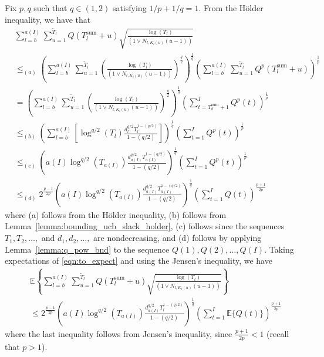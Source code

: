 \documentclass[12pt,draftcls, onecolumn]{IEEEtran}
\begin{document}
Fix $p,q$ such that $q \in (1,2)$ satisfying $1/p + 1/q = 1$. From the H{\"o}lder inequality, we have that
\begin{align}\label{eqn:to_expect}
    &\sum_{l=b}^{a( I)}\sum_{u=1}^{\tilde{T}_l} Q(T^{\text{sum}}_l+u)\sqrt{\frac{\log\left(T_l\right)}{(1 \vee N_{l,K_l(u)}(u-1))}} \nonumber\\&\leq_{(a)} \left(\sum_{l=b}^{a( I)}\sum_{u=1}^{\tilde{T}_l} \left(\frac{\log\left(T_l\right)}{(1 \vee N_{l,K_l(u)}(u-1))}\right)^{\frac{q}{2}}\right)^{\frac{1}{q}}\left(\sum_{l=b}^{a( I)}\sum_{u=1}^{\tilde{T}_l} Q^p(T^{\text{sum}}_l+u)\right)^{\frac{1}{p}} \nonumber\\& = \left(\sum_{l=b}^{a( I)}\sum_{u=1}^{\tilde{T}_l} \left(\frac{\log\left(T_l\right)}{(1 \vee N_{l,K_l(u)}(u-1))}\right)^{\frac{q}{2}}\right)^{\frac{1}{q}}\left(\sum_{t = T^{\text{sum}}_b+1}^{I} Q^p(t)\right)^{\frac{1}{p}}\nonumber\\&\leq_{(b)} \left(\sum_{l=b}^{a( I)}\left[ \log^{q/2}(T_l)\frac{d_l^{q/2}T_l^{1-(q/2)}}{1-(q/2)} \right] \right)^{\frac{1}{q}}\left(\sum_{t = 1}^{I} Q^p(t)\right)^{\frac{1}{p}} \nonumber\\& \leq_{(c)} \left(a( I) \log^{q/2}(T_{a( I)})\frac{d_{a( I)}^{q/2}T_{a(I)}^{1-(q/2)}}{1-(q/2)}\right)^{\frac{1}{q}} \left(\sum_{t = 1}^{I} Q^p(t)\right)^{\frac{1}{p}}  \nonumber\\&\leq_{(d)} 2^{\frac{p-1}{2p}}\left(a( I) \log^{q/2}(T_{a( I)})\frac{d_{a( I)}^{q/2}T_{a(I)}^{1-(q/2)}}{1-(q/2)}\right)^{\frac{1}{q}} \left(\sum_{t=1}^{ I}Q(t)\right)^{\frac{p+1}{2p}} 
\end{align}
where (a) follows from the H{\"o}lder inequality, (b) follows from Lemma~\ref{lemma:bounding_ucb_slack_holder}, (c) follows since the sequences $T_1,T_2,\dots,$ and $d_1,d_2,\dots,$ are nondecreasing, and (d) follows by applying Lemma~\ref{lemma:q_pow_bnd} to the sequence $Q(1), Q(2),\dots, Q(I)$. Taking expectations of \eqref{eqn:to_expect} and using the Jensen's inequality, we have
\begin{align}
    &\mathbb{E}\left\{\sum_{l=b}^{a( I)}\sum_{u=1}^{\tilde{T}_l} Q(T^{\text{sum}}_l+u)\sqrt{\frac{\log\left(T_l\right)}{(1 \vee N_{l,K_l(u)}(u-1))}} \right\}  \nonumber\\&\leq 2^{\frac{p-1}{2p}}\left(a( I) \log^{q/2}(T_{a( I)})\frac{d_{a( I)}^{q/2}T_l^{1-(q/2)}}{1-(q/2)}\right)^{\frac{1}{q}} \left(\sum_{t=1}^{ I}\mathbb{E}\{Q(t)\}\right)^{\frac{p+1}{2p}}  \nonumber
\end{align}
where the last inequality follows from Jensen's inequality, since $\frac{p+1}{2p} <1 $ (recall that $p>1$).
\end{document}
